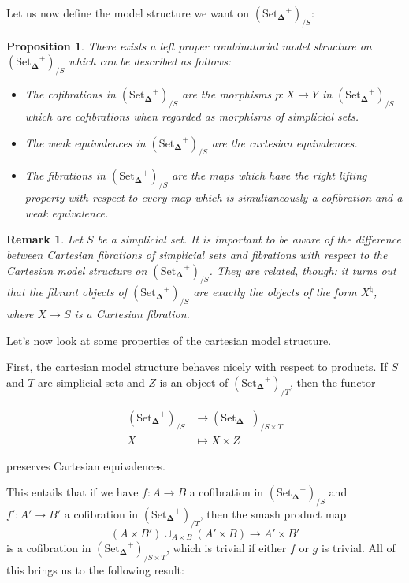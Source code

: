 \documentclass[12pt]{amsart}
\newcommand{\8}{\ensuremath{\infty}}
\newcommand{\SSet}{\ensuremath{\text{Set}_{\boldsymbol{\Delta}}}}
\newtheorem{proposition}{Proposition}
\newtheorem{remark}{Remark}
\begin{document}
{{Let us now define the model structure we want on $(\SSet^+)_{/S}$:
\begin{proposition}
  There exists a left proper combinatorial model structure on $(\SSet^+)_{/S}$ which can be described as follows:
  \begin{itemize}
    \item[(C)] The cofibrations in $(\SSet^+)_{/S}$ are the morphisms $p: X \rightarrow Y$ in $(\SSet^+)_{/S}$ which are cofibrations when regarded as morphisms of simplicial sets.
    \item[(W)] The weak equivalences in $(\SSet^+)_{/S}$ are the cartesian equivalences.
    \item[(F)] The fibrations in $(\SSet^+)_{/S}$ are the maps which have the right lifting property with respect to every map which is simultaneously a cofibration and a weak equivalence.
  \end{itemize}
\end{proposition}

\begin{remark}
  Let $S$ be a simplicial set. It is important to be aware of the difference between Cartesian fibrations of simplicial sets and fibrations with respect to the Cartesian model structure on $(\SSet^+)_{/S}$. They are related, though: it turns out that the fibrant objects of $(\SSet^+)_{/S}$ are exactly the objects of the form $X^\natural$, where $X \rightarrow S$ is a Cartesian fibration.
\end{remark}

Let's now look at some properties of the cartesian model structure.

First, the cartesian model structure behaves nicely with respect to products. If $S$ and $T$ are simplicial sets and $Z$ is an object of $(\SSet^+)_{/T}$, then the functor

\begin{align*}
  (\SSet^+)_{/S} & \rightarrow (\SSet^+)_{/S\times T} \\
  X              & \mapsto X\times Z
\end{align*}

preserves Cartesian equivalences.

This entails that if we have $f: A \rightarrow B$ a cofibration in $(\SSet^+)_{/S}$ and $f': A' \rightarrow B'$ a cofibration in $(\SSet^+)_{/T}$, then the smash product map
\[(A\times B')\displaystyle \cup_{A\times B}(A'\times B) \rightarrow A'\times B'\] is a cofibration in $(\SSet^+)_{/S\times T}$, which is trivial if either $f$ or $g$ is trivial. All of this brings us to the following result:

}}
\end{document}
